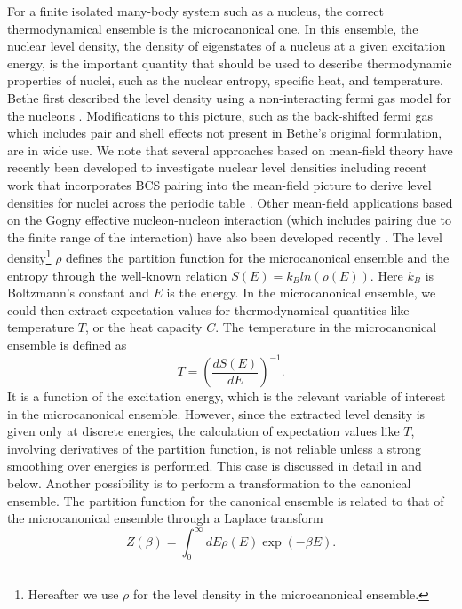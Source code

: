 \documentclass[rmp,preprint,aps,floatfix]{revtex4}
\begin{document}
For a finite isolated many-body system such as a nucleus, the correct
thermodynamical ensemble is the microcanonical one. In this ensemble,
the nuclear level density, the density of eigenstates of a nucleus
at a given excitation energy, is the important quantity that should be
used to describe thermodynamic properties of nuclei, such as the 
nuclear entropy, specific heat, and temperature. 
Bethe first described the level density using a 
non-interacting fermi gas model
for the nucleons \cite{bethe1}. Modifications to this picture, such as the 
back-shifted fermi gas which includes pair and
shell effects \cite{back_shift}
not present in Bethe's original formulation, are in 
wide use.  We note that several approaches based on mean-field 
theory have recently been developed to 
investigate nuclear level densities including recent work 
that incorporates BCS pairing into the mean-field picture 
to derive level densities for nuclei across the periodic table 
\cite{demetriou01}. Other mean-field applications based on the
Gogny effective nucleon-nucleon interaction (which includes 
pairing due to the finite range of the interaction) have also been 
developed recently \cite{hilaire01}. 
The level density\footnote{Hereafter we use $\rho$ for the level 
density in the microcanonical ensemble.} 
$\rho$ defines the partition function for 
the microcanonical ensemble and the entropy through the well-known
relation $S(E)=k_Bln(\rho(E))$.
Here $k_B$ is Boltzmann's constant and $E$ is the energy.  In 
the microcanonical ensemble, we could then extract expectation values 
for thermodynamical quantities like temperature $T$, or the 
heat capacity $C$. The temperature in the microcanonical ensemble 
is defined as 
\begin{equation}
      T=\left(\frac{dS(E)}{dE}\right)^{-1}.
      \label{eq:temp}
\end{equation}
It is a function of the excitation energy, which is 
the relevant variable of interest in the microcanonical ensemble. 
However, since the extracted level density is given only at discrete 
energies, the calculation of expectation values 
like $T$, involving derivatives of the partition function, is not
reliable unless a strong smoothing over energies is 
performed. This case is discussed in detail in  \cite{oslo3} 
and below. Another possibility
is to perform a transformation to the canonical ensemble.
The partition function for the 
canonical ensemble is related to that of the 
microcanonical ensemble through a Laplace transform
\begin{equation}
     Z(\beta)=\int_0^{\infty}dE\rho(E)\exp{(-\beta E)}.
     \label{eq:zcan}
\end{equation}
\end{document}
